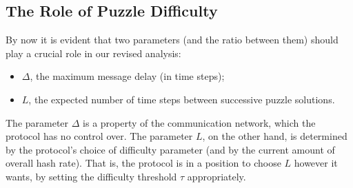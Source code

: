 \subsection{ The Role of Puzzle Difficulty}
By now it is evident that two parameters (and the ratio between them) should play a crucial
role in our revised analysis:
\begin{itemize}
    \item $\Delta$, the maximum message delay (in time steps);
    \item $L$, the expected number of time steps between successive puzzle solutions.
\end{itemize}
The parameter $\Delta$ is a property of the communication network, which the protocol has no
control over. The parameter $L$, on the other hand, is determined by the protocol’s choice of
difficulty parameter (and by the current amount of overall hash rate). That is, the protocol is
in a position to choose $L$ however it wants, by setting the difficulty threshold $\tau$ appropriately.\\

